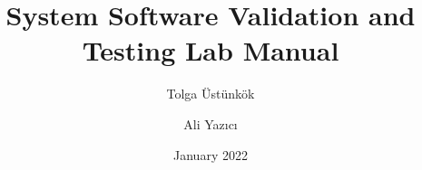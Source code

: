 \documentclass[paper=a4,fontsize=11,parskip=full,pagesize=auto,BCOR=5mm,DIV=12]{scrbook}
\begin{document}
    \titlehead{Atılım University\\Department of Software Engineering}
    \title{System Software Validation and Testing Lab Manual}
    \author{Tolga Üstünkök \and Ali Yazıcı}
    \date{January 2022}
    \publishers{Department of Software Engineering\\Atılım University}
    \maketitle
    
    \frontmatter
    \tableofcontents
    \listoffigures
    \listoftables
    
    \mainmatter
    
    
    
    
    
    
    
    
    \backmatter
    \printbibliography[heading=bibintoc]
\end{document}
